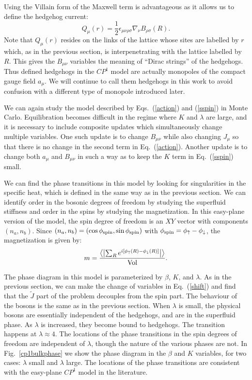 \documentclass[prb,twocolumn]{revtex4-1}
\newcommand{\cp}{$CP^1$ }
\begin{document}
Using the Villain form of the Maxwell term is advantageous as it allows us to define the hedgehog current:
\begin{equation}
Q_\mu(r)=\frac{1}{2}\epsilon_{\mu\nu\rho\sigma}\nabla_\nu B_{\rho\sigma}(R).
\label{mondef}
\end{equation}
Note that $Q_\mu(r)$ resides on the links of the lattice whose sites are labelled by $r$ which, as in the previous section, is interpenetrating with the lattice labelled by $R$. This gives the $B_{\mu\nu}$ variables the meaning of ``Dirac strings'' of the hedgehogs. Thus defined hedgehogs in the \cp model are actually monopoles of the compact gauge field $a_\mu$. We will continue to call them hedgehogs in this work to avoid confusion with a different type of monopole introduced later.

We can again study the model described by Eqs.~(\ref{action}) and (\ref{sspin}) in Monte Carlo. Equilibration becomes difficult in the regime where $K$ and $\lambda$ are large, and it is necessary to include composite updates which simultaneously change multiple variables. One such update is to change $B_{\mu\nu}$ while also changing $J_\mu$ so that there is no change in the second term in Eq.~(\ref{action}). Another update is to change both $a_\mu$ and $B_{\mu\nu}$ in such a way as to keep the $K$ term in Eq.~(\ref{sspin}) small. 

We can find the phase transitions in this model by looking for singularities in the specific heat, which is defined in the same way as in the previous section. We can identify order in the bosonic degrees of freedom by studying the superfluid stiffness and order in the spins by studying the magnetization. In this easy-plane version of the model, the spin degree of freedom is an $XY$ vector with components $(n_a,n_b)$.  Since $(n_a, n_b) = (\cos\phi_{\rm spin}, \sin\phi_{\rm spin})$ with $\phi_{\rm spin} = \phi_\uparrow - \phi_\downarrow$, the magnetization is given by:
\begin{equation}
m = \frac{\left\langle\left|\sum_R e^{i [\phi_\uparrow(R) - \phi_\downarrow(R)]}\right|\right\rangle}{\rm Vol}. 
\end{equation}

The phase diagram in this model is parameterized by $\beta$, $K$, and $\lambda$. As in the previous section, we can make the change of variables in Eq.~(\ref{shift}) and find that the $\tilde{J}$ part of the problem decouples from the spin part. The behaviour of the bosons is the same as in the previous section. When $\lambda$ is small, the physical bosons are essentially independent of the hedgehogs, and are in the superfluid phase. As $\lambda$ is increased, they become bound to hedgehogs. The transition happens at $\lambda\approx 4$. 
The locations of the phase transitions in the spin degrees of freedom are independent of $\lambda$, though the nature of the various phases are not. In Fig.~\ref{cp1bulkphase} we show the phase diagram in the $\beta$ and $K$ variables, for two cases: $\lambda$ small and $\lambda$ large. The locations of the phase transitions are consistent with the easy-plane $CP^1$ model in the literature.\cite{LesikSenthil} 
\end{document}

